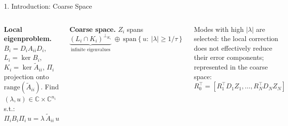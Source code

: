 \documentclass[aspectratio=169,10pt]{beamer}
\newcommand{\At}{\widetilde{A}}
\begin{document}
\begin{frame}{1. Introduction: Coarse Space}
  \small
  \begin{columns}[T,onlytextwidth]
    \setlength{\parskip}{3pt}
    \textbf{\color{schwarz}Local eigenproblem.} $B_i=D_iA_{ii}D_i$, $L_i=\ker B_i$, $K_i=\ker\At_{ii}$, $\Pi_i$
    projection onto $\mathrm{range}(\At_{ii})$. Find
    $(\lambda,u)\in\mathbb{C}\times\mathbb{C}^{n_i}$ s.t.: $\Pi_iB_i\Pi_i\,u=\lambda\,\At_{ii}\,u$

    \textbf{\color{schwarz}Coarse space.} $Z_i$ spans
    \vspace{-1.5mm}
    \[
      \underbrace{(L_i\cap K_i)^{\perp_{K_i}}}_{\text{infinite eigenvalues}}\ \oplus\
      \mathrm{span}\left\{u:\ |\lambda|\ge 1/\tau\right\}
    \]
    \vspace{-3.5mm}

    Modes with high $|\lambda|$ are selected: the local correction does not effectively reduce 
    their error components; represented in the coarse space: $R_0^\top=[R_1^\top D_1Z_1,\dots,R_N^\top D_NZ_N]$
    


\end{columns}
\end{frame}
\end{document}
